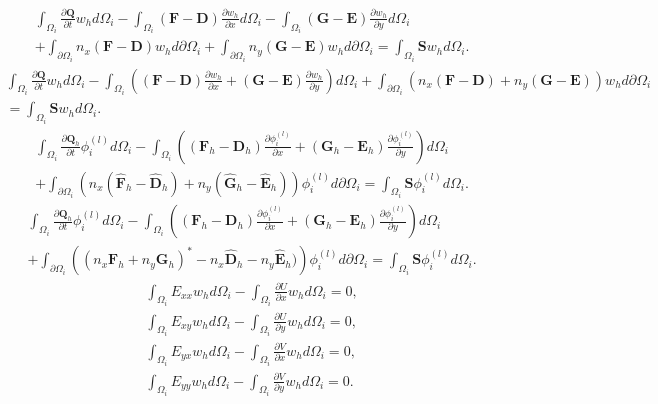 \documentclass[11pt]{article}
\begin{document}
\begin{multline}
\int_{\Omega_i}\frac{\partial \mathbf{Q}}{\partial t} w_h d\Omega_i - \int_{\Omega_i}\left(\mathbf{F}-\mathbf{D}\right) \frac{\partial w_h}{\partial x} d\Omega_i - \int_{\Omega_i}\left(\mathbf{G} - \mathbf{E} \right) \frac{\partial w_h}{\partial y} d\Omega_i \\ + \int_{\partial \Omega_i} n_x (\mathbf{F}-\mathbf{D})w_h d\partial\Omega_i + \int_{\partial \Omega_i} n_y (\mathbf{G}-\mathbf{E})w_h d\partial\Omega_i= \int_{\Omega_i}\mathbf{S}w_h d\Omega_i.
\end{multline}
\begin{multline}
\int_{\Omega_i}\frac{\partial \mathbf{Q}}{\partial t} w_h d\Omega_i - \int_{\Omega_i}\left(\left(\mathbf{F}-\mathbf{D}\right) \frac{\partial w_h}{\partial x}  + \left(\mathbf{G} - \mathbf{E} \right) \frac{\partial w_h}{\partial y} \right)d\Omega_i + \int_{\partial \Omega_i} \left(n_x (\mathbf{F}-\mathbf{D})  +  n_y (\mathbf{G}-\mathbf{E}) \right)w_h d\partial\Omega_i \\ = \int_{\Omega_i}\mathbf{S}w_h d\Omega_i.
\end{multline}
\begin{multline}
\int_{\Omega_i}\frac{\partial \mathbf{Q}_h}{\partial t} \phi_i^{(l)} d\Omega_i - \int_{\Omega_i}\left(\left(\mathbf{F}_h-\mathbf{D}_h\right) \frac{\partial \phi_i^{(l)}}{\partial x}  + \left(\mathbf{G}_h - \mathbf{E}_h \right) \frac{\partial \phi_i^{(l)}}{\partial y} \right)d\Omega_i \\ + \int_{\partial \Omega_i} \left(n_x (\widehat{\mathbf{F}}_h-\widehat{\mathbf{D}}_h)  +  n_y (\widehat{\mathbf{G}}_h-\widehat{\mathbf{E}}_h) \right)\phi_i^{(l)} d\partial\Omega_i  = \int_{\Omega_i}\mathbf{S}\phi_i^{(l)} d\Omega_i.
\end{multline}
\begin{multline}
\int_{\Omega_i}\frac{\partial \mathbf{Q}_h}{\partial t} \phi_i^{(l)} d\Omega_i - \int_{\Omega_i}\left(\left(\mathbf{F}_h-\mathbf{D}_h\right) \frac{\partial \phi_i^{(l)}}{\partial x}  + \left(\mathbf{G}_h - \mathbf{E}_h \right) \frac{\partial \phi_i^{(l)}}{\partial y} \right)d\Omega_i \\ + \int_{\partial \Omega_i} \left( (n_x\mathbf{F}_h + n_y\mathbf{G}_h)^*-n_x\widehat{\mathbf{D}}_h  -n_y\widehat{\mathbf{E}}_h) \right)\phi_i^{(l)} d\partial\Omega_i  = \int_{\Omega_i}\mathbf{S}\phi_i^{(l)} d\Omega_i.
\end{multline}
\begin{align}
\int_{\Omega_i}E_{xx} w_h d\Omega_i - \int_{\Omega_i}\frac{\partial U}{\partial x} w_h d\Omega_i= 0, \\
\int_{\Omega_i}E_{xy} w_h d\Omega_i - \int_{\Omega_i}\frac{\partial U}{\partial y} w_h d\Omega_i= 0, \\
\int_{\Omega_i}E_{yx} w_h d\Omega_i - \int_{\Omega_i}\frac{\partial V}{\partial x} w_h d\Omega_i= 0, \\
\int_{\Omega_i}E_{yy} w_h d\Omega_i - \int_{\Omega_i}\frac{\partial V}{\partial y} w_h d\Omega_i= 0.
\end{align}
\end{document}
